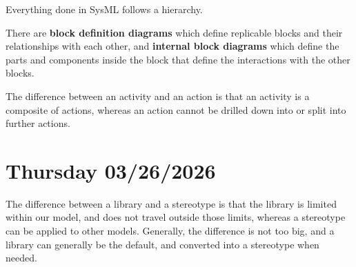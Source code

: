 \documentclass[11pt]{article}
\begin{document}
Everything done in SysML follows a hierarchy.

There are \textbf{block definition diagrams} which define replicable blocks and their relationships with each other, and \textbf{internal block diagrams} which define the parts and components inside the block that define the interactions with the other blocks.

The difference between an activity and an action is that an activity is a composite of actions, whereas an action cannot be drilled down into or split into further actions.

\section{Thursday 03/26/2026}
The difference between a library and a stereotype is that the library is limited within our model, and does not travel outside those limits, whereas a stereotype can be applied to other models.
Generally, the difference is not too big, and a library can generally be the default, and converted into a stereotype when needed.
\end{document}
